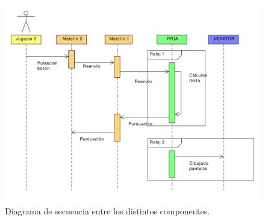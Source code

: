 \begin{figure}[h]
  \centering
  \includegraphics[width=1.0\textwidth]{images/secuencia.pdf}
  \caption{Diagrama de secuencia entre los distintos componentes.}
  \label{s2:fig:secuencia}
\end{figure}



%
%


